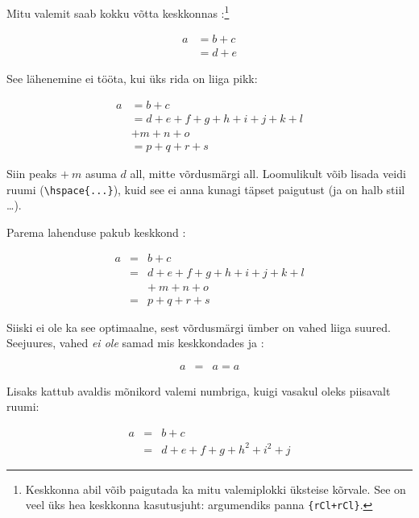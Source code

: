 Mitu valemit saab kokku võtta keskkonnas :\footnote{Keskkonna
 abil võib paigutada ka mitu valemiplokki üksteise
kõrvale. See on veel üks hea keskkonna  kasutusjuht:
argumendiks panna \texttt{\{rCl+rCl\}}.}
\begin{example}
\begin{align}
  a & = b + c \\
  & = d + e
\end{align}
\end{example}
\noindent See lähenemine ei tööta, kui üks rida on liiga pikk:
\begin{example}
\begin{align}
  a & = b + c \\
  & = d + e + f + g + h + i
  + j + k + l \nonumber \\
  & + m + n + o \\
  & = p + q + r + s
\end{align}
\end{example}
\noindent Siin peaks $+\:m$ asuma $d$ all, mitte võrdusmärgi all.
Loomulikult võib lisada veidi ruumi (\verb+\hspace{...}+), kuid see ei
anna kunagi täpset paigutust (ja on halb stiil \ldots).

Parema lahenduse pakub keskkond :
\begin{example}
\begin{eqnarray}
  a & = & b + c \\
  & = & d + e + f + g + h + i
  + j + k + l \nonumber \\
  && +\: m + n + o \\
  & = & p + q + r + s
\end{eqnarray}
\end{example}
\noindent Siiski ei ole ka see optimaalne, sest võrdusmärgi ümber on
vahed liiga suured. Seejuures, vahed \emph{ei ole} samad mis
keskkondades  ja :
\begin{example}
\begin{eqnarray}
  a & = & a = a
\end{eqnarray}
\end{example}
\noindent Lisaks kattub avaldis mõnikord valemi numbriga, kuigi vasakul
oleks piisavalt ruumi:
\begin{example}
\begin{eqnarray}
  a & = & b + c \\
  & = & d + e + f + g + h^2
  + i^2 + j
  \label{eq:viganeeqnarray}
\end{eqnarray}
\end{example}

